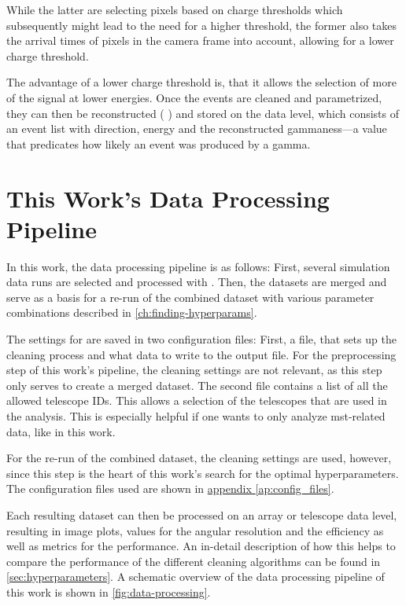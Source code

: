 While the latter are selecting pixels based on charge thresholds which
subsequently might lead to the need for a higher threshold, the former also takes the arrival times of
pixels in the camera frame into account, allowing for a lower charge threshold.

The advantage of a lower charge threshold is, that it allows the selection of more of the signal at lower energies.
Once the events are cleaned and parametrized, they can then be reconstructed (\dlob{} \rightarrow \dlt{})
and stored on the \dlt{} data level, which consists of an event list with direction, energy and the
reconstructed gammaness---a value that predicates how likely an event was produced by a gamma.

\section{This Work's Data Processing Pipeline}
\label{sec:pipeline}
In this work, the data processing pipeline is as follows: First, several simulation data runs are
selected and processed with \ctapipe{}. Then, the datasets are merged and serve as a basis for a re-run
of the combined dataset with various parameter combinations described in \autoref{ch:finding-hyperparams}.

The settings for \ctapipe{} are saved in two configuration files: First, a file, that sets up the
cleaning process and what data to write to the output file. For the preprocessing step of this work's
pipeline, the cleaning settings are not relevant, as this step only serves to create a merged dataset.
The second file contains a list of all the allowed telescope IDs. This allows a selection of the telescopes
that are used in the analysis. This is especially helpful if one wants to only analyze \gls{mst}-related
data, like in this work.

For the re-run of the combined dataset, the cleaning settings are used,
however, since this step is the heart of this work's search for the optimal hyperparameters.
The configuration files used are shown in \hyperref[ap:config_files]{appendix \ref{ap:config_files}}.

Each resulting dataset can then be processed on an array or telescope data level, resulting in
\dloa{} image plots, values for the angular resolution and the efficiency as well as metrics for the
performance. An in-detail description of how this helps to compare the performance of the different
cleaning algorithms can be found in \autoref{sec:hyperparameters}. A schematic overview of the data
processing pipeline of this work is shown in \autoref{fig:data-processing}.

